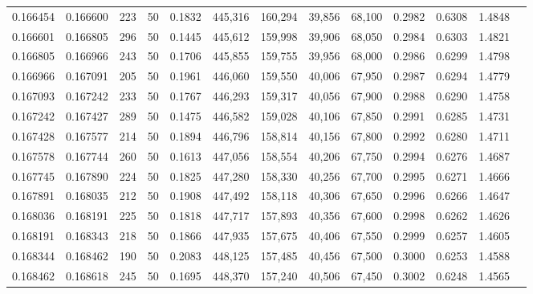 \begin{tabular}{rrrrrrrrrrrrr}
0.166454 & 0.166600 &   223 &  50 &                                     0.1832 & 445,316 & 160,294 &  39,856 &  68,100 & 0.2982 & 0.6308 & 1.4848 \\
0.166601 & 0.166805 &   296 &  50 &                                     0.1445 & 445,612 & 159,998 &  39,906 &  68,050 & 0.2984 & 0.6303 & 1.4821 \\
0.166805 & 0.166966 &   243 &  50 &                                     0.1706 & 445,855 & 159,755 &  39,956 &  68,000 & 0.2986 & 0.6299 & 1.4798 \\
0.166966 & 0.167091 &   205 &  50 &                                     0.1961 & 446,060 & 159,550 &  40,006 &  67,950 & 0.2987 & 0.6294 & 1.4779 \\
0.167093 & 0.167242 &   233 &  50 &                                     0.1767 & 446,293 & 159,317 &  40,056 &  67,900 & 0.2988 & 0.6290 & 1.4758 \\
0.167242 & 0.167427 &   289 &  50 &                                     0.1475 & 446,582 & 159,028 &  40,106 &  67,850 & 0.2991 & 0.6285 & 1.4731 \\
0.167428 & 0.167577 &   214 &  50 &                                     0.1894 & 446,796 & 158,814 &  40,156 &  67,800 & 0.2992 & 0.6280 & 1.4711 \\
0.167578 & 0.167744 &   260 &  50 &                                     0.1613 & 447,056 & 158,554 &  40,206 &  67,750 & 0.2994 & 0.6276 & 1.4687 \\
0.167745 & 0.167890 &   224 &  50 &                                     0.1825 & 447,280 & 158,330 &  40,256 &  67,700 & 0.2995 & 0.6271 & 1.4666 \\
0.167891 & 0.168035 &   212 &  50 &                                     0.1908 & 447,492 & 158,118 &  40,306 &  67,650 & 0.2996 & 0.6266 & 1.4647 \\
0.168036 & 0.168191 &   225 &  50 &                                     0.1818 & 447,717 & 157,893 &  40,356 &  67,600 & 0.2998 & 0.6262 & 1.4626 \\
0.168191 & 0.168343 &   218 &  50 &                                     0.1866 & 447,935 & 157,675 &  40,406 &  67,550 & 0.2999 & 0.6257 & 1.4605 \\
0.168344 & 0.168462 &   190 &  50 &                                     0.2083 & 448,125 & 157,485 &  40,456 &  67,500 & 0.3000 & 0.6253 & 1.4588 \\
0.168462 & 0.168618 &   245 &  50 &                                     0.1695 & 448,370 & 157,240 &  40,506 &  67,450 & 0.3002 & 0.6248 & 1.4565 \\

\end{tabular}
